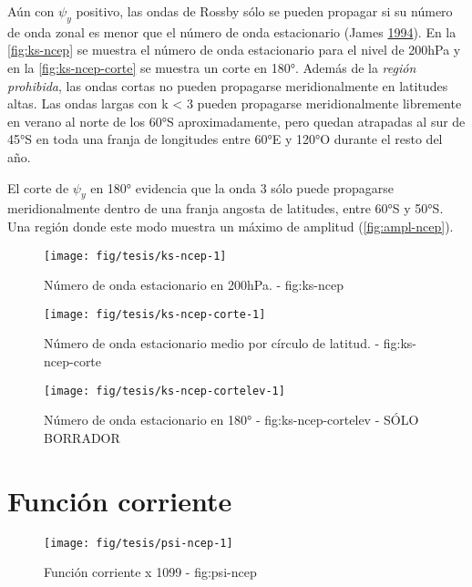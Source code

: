 \documentclass[spanish,a4paper]{book}
\begin{document}
Aún con \(\psi_y\) positivo, las ondas de Rossby sólo se pueden propagar
si su número de onda zonal es menor que el número de onda estacionario
(James \protect\hyperlink{ref-James}{1994}). En la \autoref{fig:ks-ncep}
se muestra el número de onda estacionario para el nivel de 200hPa y en
la \autoref{fig:ks-ncep-corte} se muestra un corte en 180°. Además de la
\emph{región prohibida}, las ondas cortas no pueden propagarse
meridionalmente en latitudes altas. Las ondas largas con k \textless{} 3
pueden propagarse meridionalmente libremente en verano al norte de los
60°S aproximadamente, pero quedan atrapadas al sur de 45°S en toda una
franja de longitudes entre 60°E y 120°O durante el resto del año.

El corte de \(\psi_y\) en 180° evidencia que la onda 3 sólo puede
propagarse meridionalmente dentro de una franja angosta de latitudes,
entre 60°S y 50°S. Una región donde este modo muestra un máximo de
amplitud (\autoref{fig:ampl-ncep}).

\begin{figure}
\texttt{[image: fig/tesis/ks-ncep-1]} \caption{Número de onda estacionario en 200hPa. - fig:ks-ncep}\label{fig:ks-ncep}
\end{figure}

\begin{figure}

{\centering \texttt{[image: fig/tesis/ks-ncep-corte-1]} 

}

\caption{Número de onda estacionario medio por círculo de latitud. - fig:ks-ncep-corte}\label{fig:ks-ncep-corte}
\end{figure}

\begin{figure}
\texttt{[image: fig/tesis/ks-ncep-cortelev-1]} \caption{Número de onda estacionario en 180° - fig:ks-ncep-cortelev - SÓLO BORRADOR}\label{fig:ks-ncep-cortelev}
\end{figure}

\section{Función corriente}\label{funcion-corriente}

\begin{figure}

{\centering \texttt{[image: fig/tesis/psi-ncep-1]} 

}

\caption{Función corriente x 1099 - fig:psi-ncep}\label{fig:psi-ncep}
\end{figure}
\end{document}
